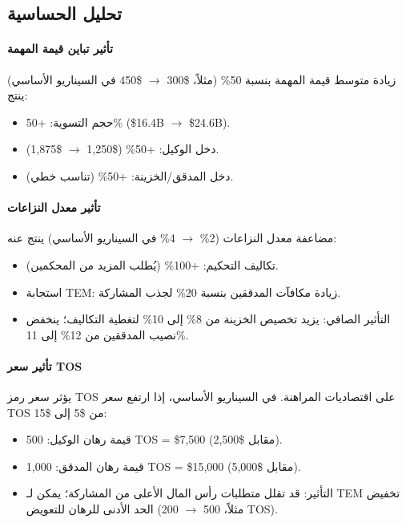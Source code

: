 \documentclass[11pt]{article}
\begin{document}
\subsection{تحليل الحساسية}
\paragraph{تأثير تباين قيمة المهمة}
زيادة متوسط قيمة المهمة بنسبة 50\% (مثلاً، \$300 $\to$ \$450 في السيناريو الأساسي) ينتج:
\begin{itemize}[noitemsep]
  \item حجم التسوية: +50\% (\$16.4B $\to$ \$24.6B).
  \item دخل الوكيل: +50\% (\$1{,}250 $\to$ \$1{,}875).
  \item دخل المدقق/الخزينة: +50\% (تناسب خطي).
\end{itemize}

\paragraph{تأثير معدل النزاعات}
مضاعفة معدل النزاعات (2\% $\to$ 4\% في السيناريو الأساسي) ينتج عنه:
\begin{itemize}[noitemsep]
  \item تكاليف التحكيم: +100\% (يُطلب المزيد من المحكمين).
  \item استجابة TEM: زيادة مكافآت المدققين بنسبة 20\% لجذب المشاركة.
  \item التأثير الصافي: يزيد تخصيص الخزينة من 8\% إلى 10\% لتغطية التكاليف؛ ينخفض نصيب المدققين من 12\% إلى 11\%.
\end{itemize}

\paragraph{تأثير سعر TOS}
يؤثر سعر رمز TOS على اقتصاديات المراهنة. في السيناريو الأساسي، إذا ارتفع سعر TOS من \$5 إلى \$15:
\begin{itemize}[noitemsep]
  \item قيمة رهان الوكيل: 500 TOS = \$7{,}500 (مقابل \$2{,}500).
  \item قيمة رهان المدقق: 1,000 TOS = \$15{,}000 (مقابل \$5{,}000).
  \item التأثير: قد تقلل متطلبات رأس المال الأعلى من المشاركة؛ يمكن لـ TEM تخفيض الحد الأدنى للرهان للتعويض (مثلاً، 500 $\to$ 200 TOS).
\end{itemize}
\end{document}
